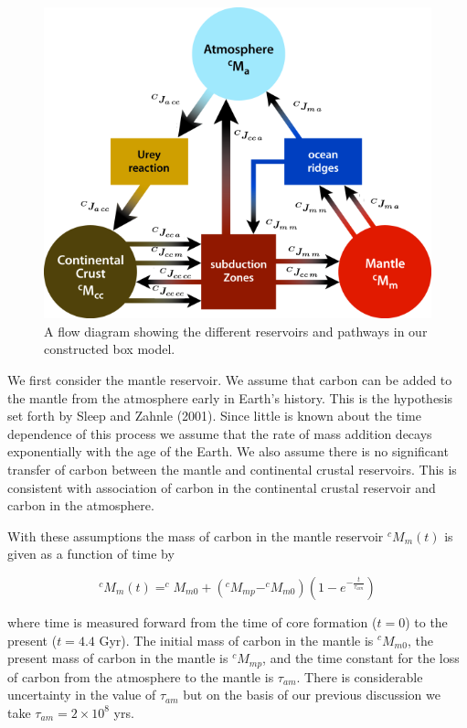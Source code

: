 {\begin{figure}
  \centering
  \includegraphics[scale=0.5]{Figures/RelabelJaniceFlowDiagram.png}
  \caption{A flow diagram showing the different reservoirs and pathways in our constructed box model.}
  \label{ReservoirFlowDiagram}
\end{figure}


We first consider the mantle reservoir. We assume that carbon can be added to the mantle from the atmosphere early in Earth's history. This is the hypothesis set forth by Sleep and Zahnle (2001). Since little is known about the time dependence of this process we assume that the rate of mass addition decays exponentially with the age of the Earth. We also assume there is no significant transfer of carbon between the mantle and continental crustal reservoirs. This is consistent with association of carbon in the continental crustal reservoir and carbon in the atmosphere.

With these assumptions the mass of carbon in the mantle reservoir $^cM_{m}(t)$ is given as a function of time by

\begin{equation}
  ^cM_{m}(t) = ^cM_{m0} + (^cM_{mp} - ^cM_{m0}) (1 - e^{-\frac{t}{\tau_{am}}})
\end{equation}

where time is measured forward from the time of core formation ($t=0$) to the present ($t=4.4$ Gyr). The initial mass of carbon in the mantle is $^cM_{m0}$, the present mass of carbon in the mantle is $^cM_{mp}$, and the time constant for the loss of carbon from the atmosphere to the mantle is $\tau_{am}$. There is considerable uncertainty in the value of $\tau_{am}$ but on the basis of our previous discussion we take $\tau_{am} = 2 \times 10^8$ yrs.

}
